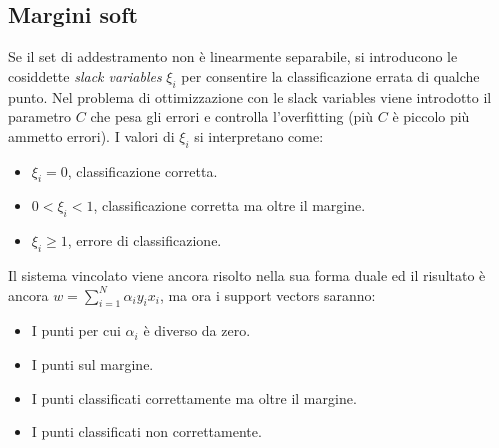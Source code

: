 \documentclass[a4paper,oneside,titlepage]{book}
\begin{document}
\subsection{Margini soft}
Se il set di addestramento non è linearmente separabile, si introducono le cosiddette \textit{slack variables} $\xi_i$ per consentire la classificazione errata di qualche punto. Nel problema di ottimizzazione con le slack variables viene introdotto il parametro $C$ che pesa gli errori e controlla l'overfitting (più $C$ è piccolo più ammetto errori). I valori di $\xi_i$ si interpretano come:
\begin{itemize}
    \item $\xi_i = 0$, classificazione corretta.
    \item $0 < \xi_i < 1$, classificazione corretta ma oltre il margine.
    \item $\xi_i \geq 1$, errore di classificazione.
\end{itemize}
Il sistema vincolato viene ancora risolto nella sua forma duale ed il risultato è ancora $w = \sum_{i=1}^N \alpha_i y_i x_i$, ma ora i support vectors saranno:
\begin{itemize}
    \item I punti per cui $\alpha_i$ è diverso da zero.
    \item I punti sul margine.
    \item I punti classificati correttamente ma oltre il margine.
    \item I punti classificati non correttamente.
\end{itemize}
\end{document}
